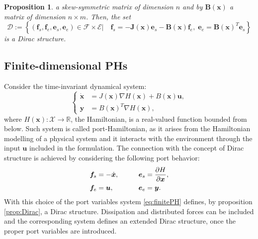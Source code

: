 \documentclass[11pt]{article}
\newtheorem{proposition}{Proposition}
\begin{document}
{\begin{proposition}
			a skew-symmetric matrix of dimension $n$ and by $\bm{B}(\bm{x})$ a matrix of dimension $n \times m$. Then, the set
			\begin{equation}
			\mathcal{D} := \left\{ (\bm{f}_s, \bm{f}_e , \bm{e}_s ,\bm{e}_e ) \in \mathcal{F} \times \mathcal{E} \vert \quad \bm{f}_s = - \bm{J}(\bm{x}) \bm{e}_s - \bm{B}(\bm{x}) \bm{f}_e, \; \bm{e}_e = \bm{B}(\bm{x})^T \bm{e}_s \right\}
			\end{equation}
			is a Dirac structure.
		\end{proposition}
		\subsection{Finite-dimensional PHs}
		Consider the time-invariant dynamical system:
		\begin{equation}
		\label{eq:finitePH}
		\begin{cases}
		\dot{ \bm{x} } &= J(\bm{x}) \nabla H(\bm{x}) + B(\bm{x})\bm{u}, \\
		\bm{y} &= B(\bm{x})^T \nabla H(\bm{x}),
		\end{cases}
		\end{equation}
		where $ H(\bm{x}) : \mathcal{X} \rightarrow \mathbb{R} $, the Hamiltonian, is a real-valued function bounded from below. Such system is called port-Hamiltonian, as it arises from the Hamiltonian modelling of a physical system and it interacts with the environment through the input $\bm{u}$ included in the formulation. The connection with the concept of Dirac structure is achieved by considering the following port behavior:
		\begin{equation}
		\begin{aligned}
		\bm{f}_s &= - \dot{ \bm{x} }, \qquad 
		&\bm{e}_s &= \diffp{H}{\bm{x}}, \\
		\bm{f}_e &= \bm{u}, \qquad
		&\bm{e}_e &= \bm{y}. \\
		\end{aligned}
		\end{equation}
		With this choice of the port variables system \eqref{eq:finitePH} defines, by proposition \ref{prop:Dirac}, a Dirac structure. Dissipation and distributed forces can be included and the corresponding system defines an extended Dirac structure, once the proper port variables are introduced.
}
\end{document}
